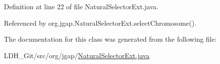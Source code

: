 Definition at line 22 of file Natural\-Selector\-Ext.\-java.



Referenced by org.\-jgap.\-Natural\-Selector\-Ext.\-select\-Chromosome().



The documentation for this class was generated from the following file\-:\begin{DoxyCompactItemize}
\item 
L\-D\-H\-\_\-\-Git/src/org/jgap/\hyperlink{_natural_selector_ext_8java}{Natural\-Selector\-Ext.\-java}\end{DoxyCompactItemize}
